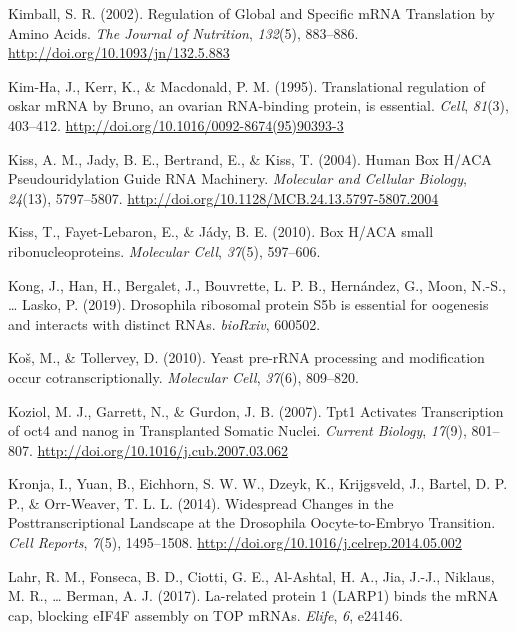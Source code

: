 \documentclass[12pt,oneside]{reedthesis}
\newlength{\cslhangindent}
\newenvironment{cslreferences}%
  {\setlength{\parindent}{0pt}%
  \everypar{\setlength{\hangindent}{\cslhangindent}}\ignorespaces}%
  {\par}
\begin{document}
\begin{cslreferences}
\leavevmode\hypertarget{ref-kimballRegulationGlobalSpecific2002}{}%
Kimball, S. R. (2002). Regulation of Global and Specific mRNA Translation by Amino Acids. \emph{The Journal of Nutrition}, \emph{132}(5), 883--886. \url{http://doi.org/10.1093/jn/132.5.883}

\leavevmode\hypertarget{ref-Kim-Ha1995i}{}%
Kim-Ha, J., Kerr, K., \& Macdonald, P. M. (1995). Translational regulation of oskar mRNA by Bruno, an ovarian RNA-binding protein, is essential. \emph{Cell}, \emph{81}(3), 403--412. \url{http://doi.org/10.1016/0092-8674(95)90393-3}

\leavevmode\hypertarget{ref-Kiss2004c}{}%
Kiss, A. M., Jady, B. E., Bertrand, E., \& Kiss, T. (2004). Human Box H/ACA Pseudouridylation Guide RNA Machinery. \emph{Molecular and Cellular Biology}, \emph{24}(13), 5797--5807. \url{http://doi.org/10.1128/MCB.24.13.5797-5807.2004}

\leavevmode\hypertarget{ref-Kiss2010}{}%
Kiss, T., Fayet-Lebaron, E., \& Jády, B. E. (2010). Box H/ACA small ribonucleoproteins. \emph{Molecular Cell}, \emph{37}(5), 597--606.

\leavevmode\hypertarget{ref-Kong2019}{}%
Kong, J., Han, H., Bergalet, J., Bouvrette, L. P. B., Hernández, G., Moon, N.-S., \ldots{} Lasko, P. (2019). Drosophila ribosomal protein S5b is essential for oogenesis and interacts with distinct RNAs. \emph{bioRxiv}, 600502.

\leavevmode\hypertarget{ref-Kos2010}{}%
Koš, M., \& Tollervey, D. (2010). Yeast pre-rRNA processing and modification occur cotranscriptionally. \emph{Molecular Cell}, \emph{37}(6), 809--820.

\leavevmode\hypertarget{ref-koziolTpt1ActivatesTranscription2007}{}%
Koziol, M. J., Garrett, N., \& Gurdon, J. B. (2007). Tpt1 Activates Transcription of oct4 and nanog in Transplanted Somatic Nuclei. \emph{Current Biology}, \emph{17}(9), 801--807. \url{http://doi.org/10.1016/j.cub.2007.03.062}

\leavevmode\hypertarget{ref-Kronja2014}{}%
Kronja, I., Yuan, B., Eichhorn, S. W. W., Dzeyk, K., Krijgsveld, J., Bartel, D. P. P., \& Orr-Weaver, T. L. L. (2014). Widespread Changes in the Posttranscriptional Landscape at the Drosophila Oocyte-to-Embryo Transition. \emph{Cell Reports}, \emph{7}(5), 1495--1508. \url{http://doi.org/10.1016/j.celrep.2014.05.002}

\leavevmode\hypertarget{ref-Lahr2017b}{}%
Lahr, R. M., Fonseca, B. D., Ciotti, G. E., Al-Ashtal, H. A., Jia, J.-J., Niklaus, M. R., \ldots{} Berman, A. J. (2017). La-related protein 1 (LARP1) binds the mRNA cap, blocking eIF4F assembly on TOP mRNAs. \emph{Elife}, \emph{6}, e24146.


\end{cslreferences}
\end{document}
